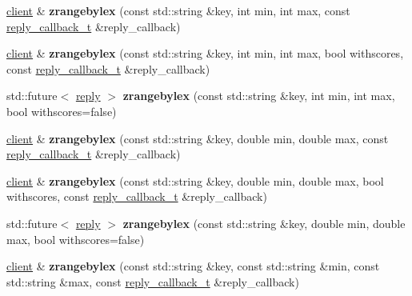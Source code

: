 \begin{DoxyCompactItemize}
\hyperlink{classcpp__redis_1_1client}{client} \& {\bfseries zrangebylex} (const std\+::string \&key, int min, int max, const \hyperlink{classcpp__redis_1_1client_a061a1140d36d2eaeda82b09a0bb3f9f2}{reply\+\_\+callback\+\_\+t} \&reply\+\_\+callback)
\item 
\mbox{\label{classcpp__redis_1_1client_aaeb445a96d9b53dc3d5455a3868823a7}} 
\hyperlink{classcpp__redis_1_1client}{client} \& {\bfseries zrangebylex} (const std\+::string \&key, int min, int max, bool withscores, const \hyperlink{classcpp__redis_1_1client_a061a1140d36d2eaeda82b09a0bb3f9f2}{reply\+\_\+callback\+\_\+t} \&reply\+\_\+callback)
\item 
\mbox{\label{classcpp__redis_1_1client_ade8510933eab6587e876b2b574255ea7}} 
std\+::future$<$ \hyperlink{classcpp__redis_1_1reply}{reply} $>$ {\bfseries zrangebylex} (const std\+::string \&key, int min, int max, bool withscores=false)
\item 
\mbox{\label{classcpp__redis_1_1client_a92819187d013805b6f993711adf67ffc}} 
\hyperlink{classcpp__redis_1_1client}{client} \& {\bfseries zrangebylex} (const std\+::string \&key, double min, double max, const \hyperlink{classcpp__redis_1_1client_a061a1140d36d2eaeda82b09a0bb3f9f2}{reply\+\_\+callback\+\_\+t} \&reply\+\_\+callback)
\item 
\mbox{\label{classcpp__redis_1_1client_aadf342f2aabeff122f24599d2f6bbd38}} 
\hyperlink{classcpp__redis_1_1client}{client} \& {\bfseries zrangebylex} (const std\+::string \&key, double min, double max, bool withscores, const \hyperlink{classcpp__redis_1_1client_a061a1140d36d2eaeda82b09a0bb3f9f2}{reply\+\_\+callback\+\_\+t} \&reply\+\_\+callback)
\item 
\mbox{\label{classcpp__redis_1_1client_a20fb39dc31f4ee0df01c9c843c45572a}} 
std\+::future$<$ \hyperlink{classcpp__redis_1_1reply}{reply} $>$ {\bfseries zrangebylex} (const std\+::string \&key, double min, double max, bool withscores=false)
\item 
\mbox{\label{classcpp__redis_1_1client_a14f5483239d01088f296539c414b2984}} 
\hyperlink{classcpp__redis_1_1client}{client} \& {\bfseries zrangebylex} (const std\+::string \&key, const std\+::string \&min, const std\+::string \&max, const \hyperlink{classcpp__redis_1_1client_a061a1140d36d2eaeda82b09a0bb3f9f2}{reply\+\_\+callback\+\_\+t} \&reply\+\_\+callback)

\end{DoxyCompactItemize}
